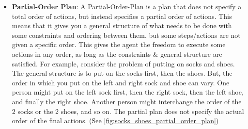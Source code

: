 \begin{itemize}
    \item \label{def:partial_order_plan}
          \textbf{Partial-Order Plan}: A Partial-Order-Plan is a plan that does not specify a total order of actions, but instead specifies a partial order of actions. This means that it gives you a general structure of what needs to be done with some constraints and ordering between them, but some steps/actions are not given a specific order. This gives the agent the freedom to execute some actions in any order, as long as the constraints \& general structure are satisfied. For example, consider the problem of putting on socks and shoes. The general structure is to put on the socks first, then the shoes. But, the order in which you put on the left and right sock and shoe can vary. One person might put on the left sock first, then the right sock, then the left shoe, and finally the right shoe. Another person might interchange the order of the 2 socks or the 2 shoes, and so on. The partial plan does not specify the actual order of the final actions. (See \autoref{fig:socks_shoes_partial_order_plan})

          \begin{figure}[ht]
              \centering
\end{figure}
\end{itemize}
